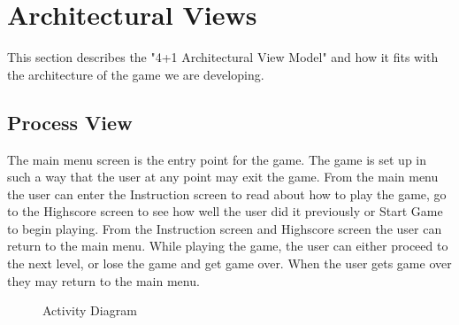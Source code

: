\section{Architectural Views}

This section describes the "4+1 Architectural View Model"\cite{architecturalViews} and how it fits
with the architecture of the game we are developing.

\subsection*{Process View}

	The main menu screen is the entry point for the game. The game is set up in such a way that the 
	user at any point may exit the game. From the main menu the user can enter the Instruction screen 
	to read about how to play the game, go to the Highscore screen to see how well the user did it 
	previously or Start Game to begin playing. From the Instruction screen and Highscore screen the 
	user can return to the main menu. While playing the game, the user can either proceed to the 
	next level, or lose the game and get game over. When the user gets game over they may return to 
	the main menu.

	\begin{figure}[H]
		\centering
		\caption{Activity Diagram}
	\end{figure}

